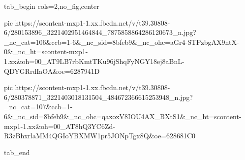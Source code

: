  
 
 
 
 

\ifcmt
  tab_begin cols=2,no_fig,center

     pic https://scontent-mxp1-1.xx.fbcdn.net/v/t39.30808-6/280153896_3221402951464844_7875858864286120673_n.jpg?_nc_cat=106&ccb=1-6&_nc_sid=8bfeb9&_nc_ohc=aGr4-STPzbgAX9ntX-0&_nc_ht=scontent-mxp1-1.xx&oh=00_AT9LB7rbKmtTKu96jShqFyNGY18ej8aBnL-QDYGRrdIaOA&oe=6287941D

     pic https://scontent-mxp1-1.xx.fbcdn.net/v/t39.30808-6/280378871_3221403018131504_484672366615253948_n.jpg?_nc_cat=107&ccb=1-6&_nc_sid=8bfeb9&_nc_ohc=qaxoxV8IOU4AX_BXtS1&_nc_ht=scontent-mxp1-1.xx&oh=00_AT8hQ3YC6Zd-R3zBhxrlaMM4QGIoYBXMW1pr5JONpTgx8Q&oe=628681C0

  tab_end
\fi
